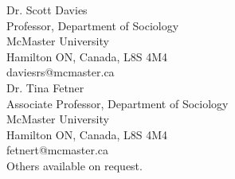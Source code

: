 \documentclass[11pt,usenames,dvipsnames]{article}
\begin{document}
\bigskip

\noindent Dr. Scott Davies\\
Professor, Department of Sociology\\
McMaster University\\
Hamilton ON, Canada, L8S 4M4\\
daviesrs@mcmaster.ca\\

\noindent Dr. Tina Fetner\\
Associate Professor, Department of Sociology\\
McMaster University\\
Hamilton ON, Canada, L8S 4M4\\
fetnert@mcmaster.ca\\

\noindent Others available on request.\\
\end{document}
